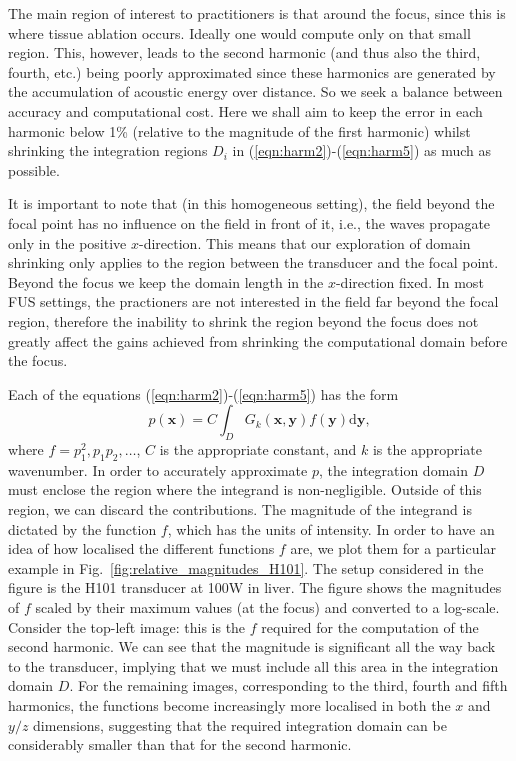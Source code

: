 \documentclass[preprint]{JASA}
\newcommand{\sd}{\mbox{d}}
\newcommand{\bx}{\mathbf{x}}
\newcommand{\by}{\mathbf{y}}
\newcommand{\red}[1]{{\color{red} #1}}
\begin{document}
The main region of interest to practitioners is that around the focus, since 
this is where tissue ablation occurs. Ideally one would compute only 
on that small region. This, however, leads to the second harmonic (and 
thus also the third, fourth, etc.) being poorly approximated since these harmonics
are generated by the accumulation of acoustic energy over distance. So we seek a 
balance between accuracy and computational cost. Here we shall aim to 
keep the error in each harmonic below 1\% (relative to the magnitude of 
the first harmonic) whilst shrinking the integration regions $D_i$ in 
(\ref{eqn:harm2})-(\ref{eqn:harm5}) as much as possible. 

It is important to note that (in this homogeneous setting), the field beyond the 
focal point has no influence on the field in front of it, i.e., the waves propagate
only in the positive $x$-direction. This means that our exploration of domain 
shrinking only applies to the region between the transducer and the focal point.
Beyond the focus we keep the domain length in the $x$-direction fixed. In most
\red{FUS} settings, the practioners are not interested in the field far beyond the 
focal region, therefore the inability to shrink the region beyond the focus does 
not greatly affect the gains achieved from shrinking the computational domain before the focus.

Each of the equations (\ref{eqn:harm2})-(\ref{eqn:harm5}) has the form
\begin{equation}
    p(\bx) = C\int_D G_k(\bx,\by) f(\by) \sd\by,
    \label{eqn:RHS}
\end{equation}
where $f = p_1^2, p_1p_2,\ldots$, $C$ is the appropriate constant, and $k$ is the 
appropriate wavenumber. In order to accurately approximate $p$, the integration 
domain $D$ must enclose the region where the integrand
is non-negligible. Outside of this region, we can discard the contributions. 
The magnitude of the integrand is dictated by the function $f$, which has the 
units of intensity. In order to have
an idea of how localised the different functions $f$ are, we plot them
for a particular example in Fig.~\ref{fig:relative_magnitudes_H101}. The setup considered in the figure 
is the H101 transducer at 100W in liver. The figure shows the magnitudes of $f$
scaled by their maximum values (at the focus) and converted to a log-scale. 
Consider the top-left image: this is the $f$ required for the computation of the 
second harmonic. We can see that the magnitude is significant all the way back 
to the transducer, implying that we must include all this area in the integration 
domain $D$. For the remaining images, corresponding to the third, fourth and 
fifth harmonics, the functions become increasingly more localised in both the 
$x$ and $y/z$ dimensions, suggesting that the required integration domain can
be considerably smaller than that for the second harmonic.
\end{document}
